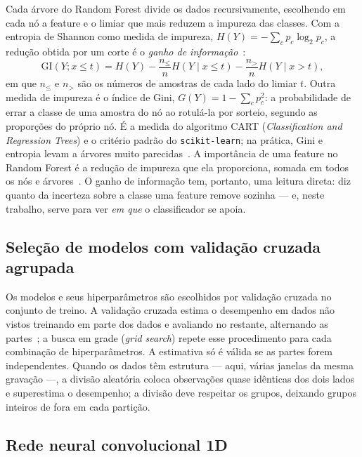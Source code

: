 Cada árvore do Random Forest divide os dados recursivamente, escolhendo em cada nó a feature e o limiar
que mais reduzem a impureza das classes. Com a entropia de Shannon como medida de
impureza, $H(Y) = -\sum_c p_c \log_2 p_c$, a redução obtida por um corte é o
\emph{ganho de informação}~\cite[seç.~9.2]{hastie2009}:
\begin{equation}
  \text{GI}(Y; x \le t) = H(Y) - \frac{n_{\le}}{n} H(Y \mid x \le t) - \frac{n_{>}}{n} H(Y \mid x > t),
\end{equation}
em que $n_{\le}$ e $n_{>}$ são os números de amostras de cada lado do limiar $t$.
Outra medida de impureza é o índice de Gini, $G(Y) = 1 - \sum_c p_c^2$: a
probabilidade de errar a classe de uma amostra do nó ao rotulá-la por sorteio,
segundo as proporções do próprio nó. É a medida do algoritmo CART
(\emph{Classification and Regression Trees}) e o critério padrão do
\texttt{scikit-learn}; na prática,
Gini e entropia levam a árvores muito parecidas~\cite[seç.~9.2]{hastie2009}. A importância de uma feature no Random
Forest é a redução de impureza que ela proporciona, somada em todos os nós e
árvores~\cite[cap.~15]{hastie2009}. O ganho de informação tem, portanto, uma leitura
direta: diz quanto da incerteza sobre a classe uma feature remove sozinha --- e,
neste trabalho, serve para ver \emph{em que} o classificador se apoia.

\subsection{Seleção de modelos com validação cruzada agrupada}
\label{sec:tec-selecao}

Os modelos e seus
hiperparâmetros são escolhidos por validação cruzada no conjunto de treino. A
validação cruzada estima o desempenho em dados não vistos treinando em parte dos
dados e avaliando no restante, alternando as partes~\cite[seç.~7.10]{hastie2009}; a busca
em grade (\emph{grid search}) repete esse procedimento para cada combinação de
hiperparâmetros. A estimativa só é válida se as partes forem independentes.
Quando os dados têm estrutura --- aqui, várias janelas da mesma gravação ---, a
divisão aleatória coloca observações quase idênticas dos dois lados e
superestima o desempenho; a divisão deve respeitar os grupos, deixando grupos
inteiros de fora em cada partição.

\subsection{Rede neural convolucional 1D}
\label{sec:tec-cnn}

